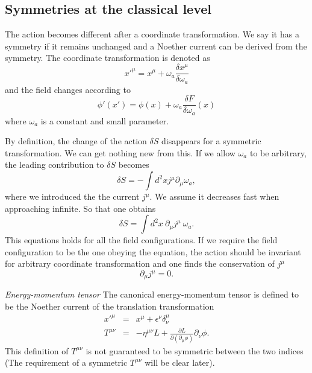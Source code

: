 \documentclass[submission, PhysLectNotes]{SciPost}
\begin{document}
\subsection{Symmetries at the classical level}
The action becomes different after a coordinate transformation. We say it has a symmetry if it remains unchanged and a Noether current can be derived from the symmetry. The coordinate transformation is denoted as
\begin{equation}
    x'^\mu = x^\mu + \omega_a \frac{\delta x^\mu}{\delta \omega_a}
\end{equation}
and the field changes according to 
\begin{equation}
    \phi'(x') = \phi(x) + \omega_a \frac{\delta F}{\delta \omega_a}(x)
\end{equation}
where $\omega_a$ is a constant and small parameter.

By definition, the change of the action $\delta S$ disappears for a symmetric transformation. We can get nothing new from this. If we allow $\omega_a$ to be arbitrary, the leading contribution to $\delta S$ becomes
\begin{equation}
    \delta S = -\int d^2x j^\mu \partial_\mu \omega_a,  
\end{equation}
where we introduced the the current $j^\mu$. We assume it decreases fast when approaching infinite. So that one obtains 
\begin{equation}
    \delta S = \int d^2x\ \partial_\mu j^\mu \ \omega_a.
\end{equation}
This equations holds for all the field configurations. If we require the field configuration to be the one obeying the equation, the action should be invariant for arbitrary coordinate transformation and one finds the conservation of $j^\mu$
\begin{equation}
    \partial_\mu j^\mu = 0.
\end{equation}

{\it Energy-momentum tensor}
The canonical energy-momentum tensor is defined to be the Noether current of the translation transformation
\begin{eqnarray}
    x'^\mu &=& x^\mu + \epsilon^\nu \delta^\mu_\nu \\
    T^{\mu\nu} &=& -\eta^{\mu\nu} L + \frac{\partial L}{\partial(\partial_\mu \phi)}\partial_\nu \phi.
\end{eqnarray}
This definition of $T^{\mu\nu}$ is not guaranteed to be symmetric between the two indices (The requirement of a symmetric $T^{\mu\nu}$ will be clear later). 
\end{document}
